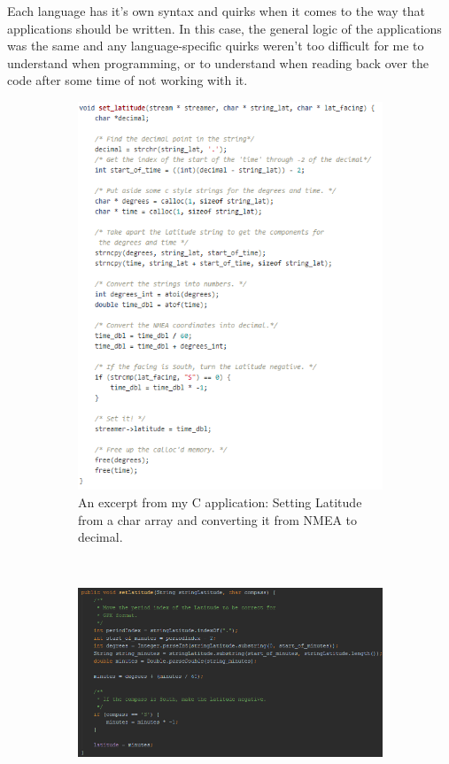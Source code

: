 \documentclass{article}
\begin{document}
Each language has it's own syntax and quirks when it comes to the way that applications should be written. In this case, the general logic of the applications was the same and any language-specific quirks weren't too difficult for me to understand when programming, or to understand when reading back over the code after some time of not working with it.
\begin{figure}[H]
        \centering
        \begin{subfigure}[b]{0.4\textwidth}
                \includegraphics[width=\textwidth]{img/latitude}
                \caption{An excerpt from my C application: Setting Latitude from a char array and converting it from NMEA to decimal.}
                \label{fig:latc}
        \end{subfigure}%
        ~ %
        \begin{subfigure}[b]{0.5\textwidth}
                \includegraphics[width=\textwidth]{img/latitudejava}

\end{subfigure}
\end{figure}
\end{document}
